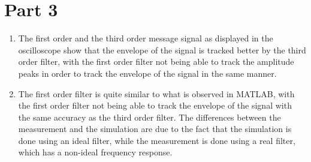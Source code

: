 \section{Part 3}
\begin{enumerate}
    \item The first order and the third order message signal as displayed in the oscilloscope show that the envelope of the signal is tracked better by the third order filter, with the first order filter not being able to track the amplitude peaks in order to track the envelope of the signal in the same manner.
    \item The first order filter is quite similar to what is observed in MATLAB, with the first order filter not being able to track the envelope of the signal with the same accuracy as the third order filter. The differences between the measurement and the simulation are due to the fact that the simulation is done using an ideal filter, while the measurement is done using a real filter, which has a non-ideal frequency response.
\end{enumerate}
